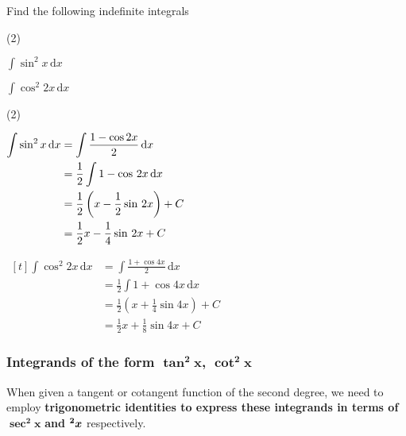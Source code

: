 \documentclass[11pt,a4paper]{book}
\let\csc\relax
\DeclareMathOperator{\csc}{cosec}
\begin{document}
\begin{example}

Find the following indefinite integrals

\begin{tasks}[label=(\alph*),label-width=3.5ex](2)

\task ${\displaystyle \int\sin^{2}x\, \mathrm{d}x}$

\task ${\displaystyle \int\cos^{2}2x\, \mathrm{d}x}$

\end{tasks}

\Solution

\begin{tasks}[label=(\alph*),label-width=3.5ex](2)

\task
$
\begin{aligned}[t]
\int\sin^{2}x\, \mathrm{d}x & =\int\frac{1-\cos2x}{2}\, \mathrm{d}x\\
 & =\frac{1}{2}\int1-\cos\thinspace2x\, \mathrm{d}x\\
 & =\frac{1}{2}\left(x-\frac{1}{2}\sin\thinspace2x\right)+C\\
 & =\frac{1}{2}x-\frac{1}{4}\sin\thinspace2x+C
\end{aligned}
$

\task
$
\begin{aligned}[t]
\int\cos^{2}2x\, \mathrm{d}x & =\int\frac{1+\cos4x}{2}\, \mathrm{d}x\\
 & =\frac{1}{2}\int1+\cos4x\, \mathrm{d}x\\
 & =\frac{1}{2}\left(x+\frac{1}{4}\sin4x\right)+C\\
 & =\frac{1}{2}x+\frac{1}{8}\sin4x+C
\end{aligned}
$

\end{tasks}

\end{example}


\subsubsection{Integrands of the form $\boldsymbol{\tan^{2}x}$, $\boldsymbol{\cot^{2}x}$}

When given a tangent or cotangent function of the second degree, we
need to employ \textbf{trigonometric identities to express these integrands in terms of }$\boldsymbol{\sec^{2}x}$\textbf{ and }$\boldsymbol{\csc^{2}x}$  respectively.
\end{document}

